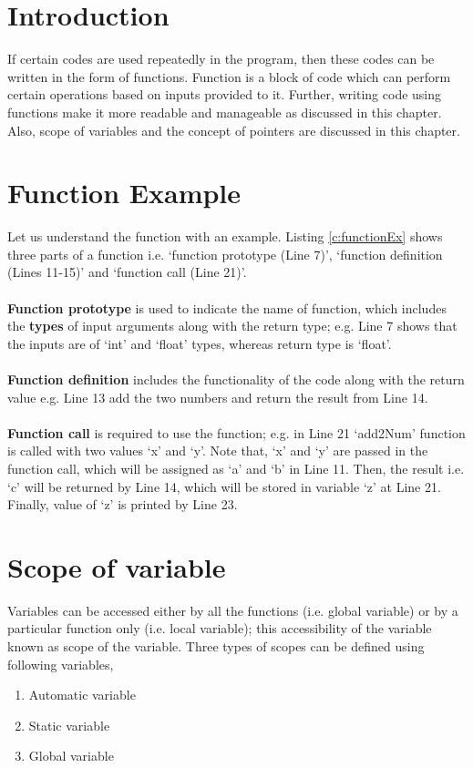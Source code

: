 \section{Introduction}
If certain codes are used repeatedly in the program, then these codes can be written in the form of functions. Function is a block of code which can perform certain operations based on inputs provided to it. Further, writing code using functions make it more readable and manageable as discussed in this chapter. Also, scope of variables and the concept of pointers are discussed in this chapter. 

\section{Function Example}
Let us understand the function with an example. Listing \ref{c:functionEx} shows three parts of a function i.e. `function prototype (Line 7)', `function definition (Lines 11-15)' and `function call (Line 21)'.
\\ \\
\textbf{Function prototype} is used to indicate the name of function, which includes the \textbf{types} of input arguments along with the return type; e.g. Line 7 shows that the inputs are of `int' and `float' types, whereas return type is `float'.
\\ \\
\textbf{Function definition} includes the functionality of the code along with the return value e.g. Line 13 add the two numbers and return the result from Line 14. 
\\ \\
\textbf{Function call} is required to use the function; e.g. in Line 21 `add2Num' function is called with two values `x' and `y'. Note that, `x' and `y' are passed in the function call, which will be assigned as `a' and `b' in Line 11. Then, the result i.e. `c' will be returned by Line 14, which will be stored in variable `z' at Line 21. Finally, value of `z' is printed by Line 23.  



\section{Scope of variable}
Variables can be accessed either by all the functions (i.e. global variable) or by a particular function only (i.e. local variable); this accessibility of the variable known as scope of the variable. Three types of scopes can be defined using following variables, 
\begin{enumerate}
	\item Automatic variable 
	\item Static variable
	\item Global variable
\end{enumerate}

